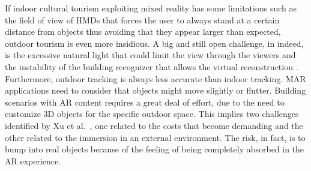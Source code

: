 If indoor cultural tourism exploiting mixed reality has some limitations such as the field of view of \glspl{HMD} that forces the user to always stand at a certain distance from objects thus avoiding that they appear larger than expected, outdoor tourism is even more insidious. A big and still open challenge, in indeed, is the excessive natural light that could limit the view through the viewers and the instability of the building recognizer that allows the virtual reconstruction \cite{debandi_enhancing_2018}. Furthermore, outdoor tracking is always less accurate than indoor tracking. MAR applications need to consider that objects might move slightly or flutter. Building scenarios with AR content requires a great deal of effort, due to the need to customize 3D objects for the specific outdoor space. This implies two challenges identified by Xu et al.~\cite{xu_exploring_2018}, one related to the costs that become demanding and the other related to the immersion in an external environment. The risk, in fact, is to bump into real objects because of the feeling of being completely absorbed in the AR experience.

